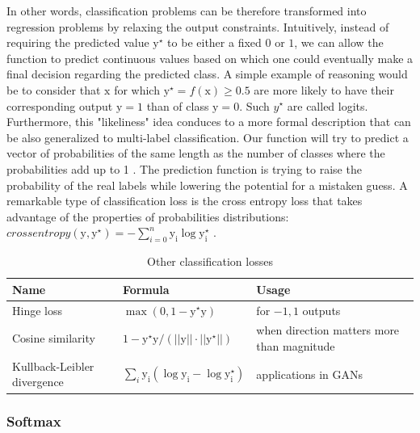 \par In other words, classification problems can be therefore transformed into regression problems by relaxing the output constraints. Intuitively, instead of requiring the predicted value $\mathrm{y}^\star$ to be either a fixed $0$ or $1$, we can allow the function to predict continuous values based on which one could eventually make a final decision regarding the predicted class. A simple example of reasoning would be to consider that $\mathrm{x}$ for which $\mathrm{y}^\star=f(\mathrm{x}) \geq 0.5$ are more likely to have their corresponding output $\mathrm{y}=1$ than of class $\mathrm{y}=0$. Such $y^\star$ are called logits. Furthermore, this "likeliness" idea conduces to a more formal description that can be also generalized to multi-label classification. Our function will try to predict a vector of probabilities of the same length as the number of classes where the probabilities add up to 1 \cite{losssurvey}. The prediction function is trying to raise the probability of the real labels while lowering the potential for a mistaken guess. A remarkable type of classification loss is the cross entropy loss that takes advantage of the properties of probabilities distributions: $\textit{crossentropy}(\mathrm{y}, \mathrm{y^\star}) = -\sum_{i=0}^n{\mathrm{y_i} \log{\mathrm{y_i^\star}}}$ \cite{losssurvey}.

\begin{table}[htbp]
\begin{center}
\begin{tabular}
{|p{120pt}|p{120pt}|p{120pt}|}
\hline
 Name  &  Formula & Usage\\
\hline Hinge loss & $\max(0, 1-\mathrm{y}^\star \mathrm{y})$ & for ${-1,1}$ outputs \\
\hline Cosine similarity & $1-\mathrm{y}^\star \mathrm{y} / (||\mathrm{y}|| \cdot ||\mathrm{y}^\star||)$ & when direction matters more than magnitude\\

\hline Kullback-Leibler divergence  & $\sum_{i}{\mathrm{y_i} (\log{\mathrm{y_i}} - \log{\mathrm{y_i^\star}})}$ & applications in GANs\\
\hline
\end{tabular}
\end{center}
\caption{Other classification losses \cite{losssurvey} }
\label{ClassLosses}
\end{table}

\subsubsection{Softmax}
\label{subsubsec:ch3sec2subsec4subsubsec2}

